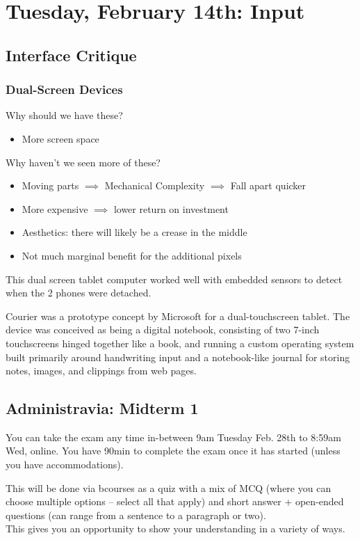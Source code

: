 \section{Tuesday, February 14th: Input}
\subsection{Interface Critique}
\subsubsection{Dual-Screen Devices}
Why should we have these?
\begin{itemize}
    \item More screen space
\end{itemize}

Why haven't we seen more of these?
\begin{itemize}
    \item Moving parts $\implies$ Mechanical Complexity $\implies$ Fall apart quicker
    \item More expensive $\implies$ lower return on investment
    \item Aesthetics: there will likely be a crease in the middle
    \item Not much marginal benefit for the additional pixels
\end{itemize}

This dual screen tablet computer worked well with embedded sensors to detect when the 2 phones were detached.

Courier was a prototype concept by Microsoft for a dual-touchscreen tablet. The device was conceived as being a digital notebook, consisting of two 7-inch touchscreens hinged together like a book, and running a custom operating system built primarily around handwriting input and a notebook-like journal for storing notes, images, and clippings from web pages.

\subsection{Administravia: Midterm 1}
You can take the exam any time in-between 9am Tuesday Feb. 28th to 8:59am Wed, online. You have 90min to complete the exam once it has started (unless you have accommodations).

This will be done via bcourses as a quiz with a mix of MCQ (where you can choose multiple options -- select all that apply) and short answer + open-ended questions (can range from a sentence to a paragraph or two). \\
This gives you an opportunity to show your understanding in a variety of ways.

